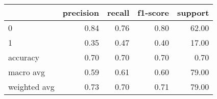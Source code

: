 \begin{tabular}{lrrrr}
\toprule
 & precision & recall & f1-score & support \\
\midrule
0 & 0.84 & 0.76 & 0.80 & 62.00 \\
1 & 0.35 & 0.47 & 0.40 & 17.00 \\
accuracy & 0.70 & 0.70 & 0.70 & 0.70 \\
macro avg & 0.59 & 0.61 & 0.60 & 79.00 \\
weighted avg & 0.73 & 0.70 & 0.71 & 79.00 \\
\bottomrule
\end{tabular}
